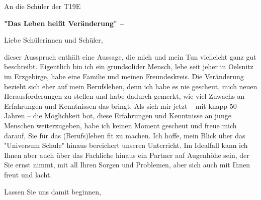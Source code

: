 \documentclass[12pt,a4paper]{letter}
\begin{document}
\begin{letter}{An die Schüler der T19E}
\begin{flushleft}
\textbf{"Das Leben heißt Veränderung" –}\\
\end{flushleft}
\opening{Liebe Schülerinnen und Schüler,}
dieser Ausspruch enthält eine Aussage, die mich und mein Tun vielleicht ganz gut beschreibt.
Eigentlich bin ich ein grundsolider Mensch, lebe seit jeher in Oelsnitz im Erzgebirge, habe eine Familie und meinen Freundeskreis.
Die Veränderung bezieht sich eher auf mein Berufsleben, denn ich habe es nie gescheut, mich neuen Herausforderungen zu stellen und habe dadurch gemerkt, wie viel Zuwachs an Erfahrungen und Kenntnissen das bringt.
Als sich mir jetzt – mit knapp 50 Jahren – die Möglichkeit bot, diese Erfahrungen und Kenntnisse an junge Menschen weiterzugeben, habe ich keinen Moment gescheut und freue mich darauf, Sie für das (Berufs)leben fit zu machen. Ich hoffe, mein Blick über das "Universum Schule" hinaus bereichert unseren Unterricht.
Im Idealfall kann ich Ihnen aber auch über das Fachliche hinaus ein Partner auf Augenhöhe sein, der Sie ernst nimmt, mit all Ihren Sorgen und Problemen, aber sich auch mit Ihnen freut und lacht.
\closing{Lassen Sie uns damit beginnen,} 
\end{letter} 
\end{document}
